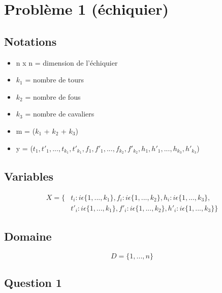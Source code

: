 \documentclass[a4paper,11pt]{article}
\begin{document}
\section{Problème 1 (échiquier)}
\subsection{Notations}
\begin{itemize}
\item n x n = dimension de l'échiquier
\item $k_{1}$ = nombre de tours
\item $k_{2}$ = nombre de fous
\item $k_{3}$ = nombre de cavaliers

\item m = ($k_{1}$ + $k_{2}$ + $k_{3}$)
\item y = ($t_{1}, t'_{1}, ..., t_{k_{1}}, t'_{k_{1}}, f_{1}, f'_{1}, ..., f_{k_{2}}, f'_{k_{2}}, h_{1}, h'_{1}, ..., h_{k_{3}}, h'_{k_{3}}$)
\end{itemize}

\subsection{Variables}
\begin{equation}
  \begin{split}
    X = \{ &t_{i} : i \epsilon  \{1, ..., k_{1} \}, f_{i} : i \epsilon  \{1, ..., k_{2} \}, h_{i} : i \epsilon  \{1, ..., k_{3} \}, \\
    &t'_{i} : i \epsilon  \{1, ..., k_{1} \}, f'_{i} : i \epsilon  \{1, ..., k_{2} \}, h'_{i} : i \epsilon  \{1, ..., k_{3} \} \}
  \end{split}
\end{equation}

\subsection{Domaine}
$$D = \{1, ..., n \}$$

\subsection{Question 1}
\end{document}
